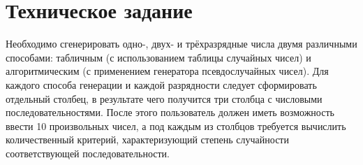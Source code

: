 \chapter{Техническое задание}

Необходимо сгенерировать одно-, двух- и трёхразрядные числа двумя различными способами: табличным (с использованием таблицы случайных чисел) и алгоритмическим (с применением генератора псевдослучайных чисел). Для каждого способа генерации и каждой разрядности следует сформировать отдельный столбец, в результате чего получится три столбца с числовыми последовательностями. После этого пользователь должен иметь возможность ввести 10 произвольных чисел, а под каждым из столбцов требуется вычислить количественный критерий, характеризующий степень случайности соответствующей последовательности.
